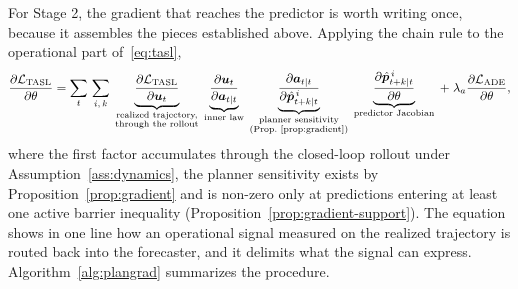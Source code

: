 \documentclass[11pt]{article}
\theoremstyle{plain}
\theoremstyle{definition}
\newcommand{\bu}{\bm{u}}
\begin{document}
For Stage 2, the gradient that reaches the predictor is worth writing
once, because it assembles the pieces established above. Applying the
chain rule to the operational part of~\eqref{eq:tasl},
\begin{equation}
	\label{eq:stage2-gradient}
	\frac{\partial \mathcal{L}_{\mathrm{TASL}}}{\partial \theta}
	= \sum_{t}\, \sum_{i,\,k}\;
	\underbrace{\frac{\partial \mathcal{L}_{\mathrm{TASL}}}
		{\partial \bu_t}}_{\substack{\text{realized trajectory,} \\
			\text{through the rollout}}}
	\;
	\underbrace{\frac{\partial \bu_t}{\partial \bm{a}_{t \mid t}}}
	_{\text{inner law}}
	\;
	\underbrace{\frac{\partial \bm{a}_{t \mid t}}
		{\partial \hat{\bm{p}}^{\,i}_{t+k \mid t}}}
	_{\substack{\text{planner sensitivity} \\
			(\text{Prop.~\ref{prop:gradient}})}}
	\;
	\underbrace{\frac{\partial \hat{\bm{p}}^{\,i}_{t+k \mid t}}
		{\partial \theta}}_{\text{predictor Jacobian}}
	\;+\; \lambda_a
	\frac{\partial \mathcal{L}_{\mathrm{ADE}}}{\partial \theta},
\end{equation}
where the first factor accumulates through the closed-loop rollout
under Assumption~\ref{ass:dynamics}, the planner sensitivity exists by
Proposition~\ref{prop:gradient} and is non-zero only at predictions
entering at least one active barrier inequality
(Proposition~\ref{prop:gradient-support}). The equation shows in one
line how an operational signal measured on the realized trajectory is
routed back into the forecaster, and it delimits what the signal can
express. Algorithm~\ref{alg:plangrad} summarizes the procedure.
 
\end{document}
